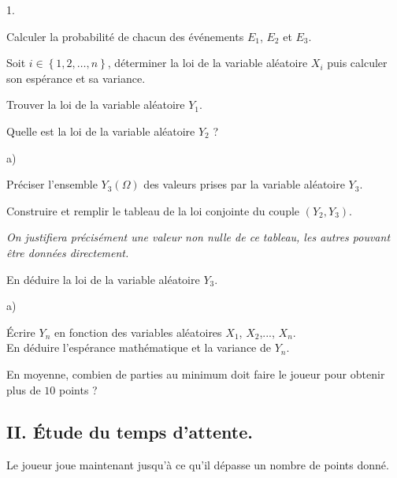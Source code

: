 \documentclass[11pt]{article}%
\begin{document}
\begin{noliste}{1.}
 \setlength{\itemsep}{4mm}
\item Calculer la probabilité de chacun des événements $E_{1}$, $E_{2}$
et $E_{3}$.

\item Soit $i\in \left\{ 1,2,\dots,n\right\} $, déterminer la loi de la
variable aléatoire $X_{i}$ puis calculer son espérance et sa
variance.

\item Trouver la loi de la variable aléatoire $Y_{1}$.

\item Quelle est la loi de la variable aléatoire $Y_{2}$ ?

\item
\begin{noliste}{a)}
 \setlength{\itemsep}{2mm}
\item Préciser l'ensemble $Y_{3}\left( \Omega \right) $ des valeurs
prises par la variable aléatoire $Y_{3}$.

\item Construire et remplir le tableau de la loi conjointe du couple
$\left(
Y_{2},Y_{3}\right).$

\textit{On justifiera précisément une valeur non nulle de ce
tableau, les autres pouvant être données directement.}

\item En déduire la loi de la variable aléatoire $Y_{3}$.
\end{noliste}

\item
\begin{noliste}{a)}
 \setlength{\itemsep}{2mm}
\item Écrire $Y_{n}$ en fonction des variables aléatoires $X_{1}$,
$X_{2}$,..., $X_{n}$.\\
En déduire l'espérance mathématique et la variance de $Y_{n}$.

\item En moyenne, combien de parties au minimum doit faire le joueur
pour
obtenir plus de $10$ points ?
\end{noliste}
\end{noliste}

\subsection*{II. Étude du temps d'attente.}

Le joueur joue maintenant jusqu'à ce qu'il dépasse un nombre de
points donné.
\end{document}
